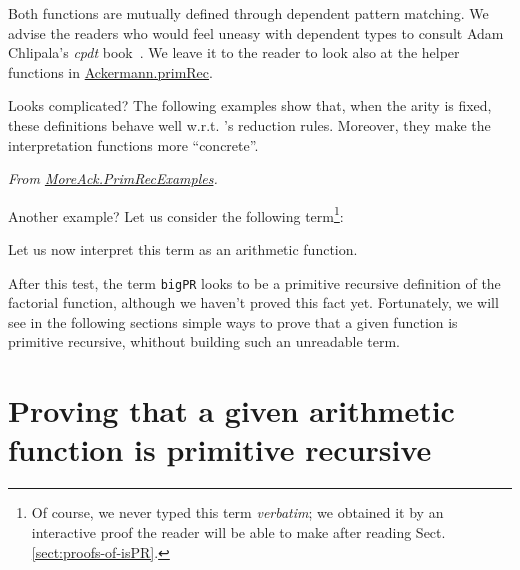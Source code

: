 
Both functions are mutually defined through dependent pattern matching. We advise the readers who 
would feel uneasy with dependent types to consult Adam Chlipala's \emph{cpdt}  book~\cite{chlipalacpdt2011}. We leave it to the reader  to look also at the helper functions in
\href{../theories/html/hydras.Ackermann.primRec.html}{Ackermann.primRec}.

\vspace{4pt}



\vspace{4pt}

Looks complicated? The following examples show that, when
the arity is fixed, these definitions behave well w.r.t. 
\coq's reduction rules. Moreover, they make the interpretation functions more ``concrete''.

\vspace{4pt}
\noindent
\emph{From \href{../theories/html/hydras.MoreAck.PrimRecExamples.html}{MoreAck.PrimRecExamples}.}



\vspace{4pt}
\noindent

Another example?
Let us consider the following term\footnote{Of course, we never typed this term \emph{verbatim}; we obtained it by an interactive proof the reader will be able to make after 
reading Sect.\vref{sect:proofs-of-isPR}.}:

\label{sect:bigfac}




Let us now interpret this term as an arithmetic function.

\vspace{4pt}
\noindent




After this test, the term \texttt{bigPR} looks to be a primitive recursive definition of the factorial function, although we haven't proved this fact yet. Fortunately, we will see in the following sections simple ways to prove that a given function is primitive recursive, whithout building such an unreadable term.

\section{Proving that a given arithmetic function is primitive recursive}
\label{sect:proofs-of-isPR}

